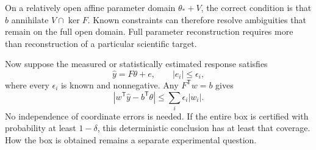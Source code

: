 On a relatively open affine parameter domain $\theta_*+V$, the correct condition
is that $b$ annihilate $V\cap\ker F$. Known constraints can therefore resolve
ambiguities that remain on the full open domain. Full parameter reconstruction
requires more than reconstruction of a particular scientific target.

Now suppose the measured or statistically estimated response satisfies
\begin{equation}
 \widehat y=F\theta+e,\qquad |e_i|\leq\epsilon_i,
 \label{precision:response-error}
\end{equation}
where every $\epsilon_i$ is known and nonnegative. Any $F^{\mathsf T}w=b$ gives
\begin{equation}
 |w^{\mathsf T}\widehat y-b^{\mathsf T}\theta|
 \leq \sum_i\epsilon_i|w_i|.
 \label{precision:linear-upper}
\end{equation}
No independence of coordinate errors is needed. If the entire box is certified
with probability at least $1-\delta$, this deterministic conclusion has at least
that coverage. How the box is obtained remains a separate experimental question.

